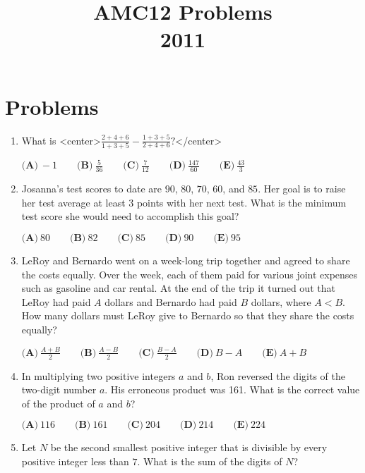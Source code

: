 \documentclass{article}
\title{AMC12 Problems \\ 2011}
\date{}
\begin{document}
\maketitle\thispagestyle{fancy}\newpage\section*{Problems}\begin{enumerate}[label=\arabic*., itemsep=0.5em]\item What is <center>$ \frac{2+4+6}{1+3+5}-\frac{1+3+5}{2+4+6}? $</center>


$\textbf{(A)}\ -1 \qquad \textbf{(B)}\ \frac{5}{36} \qquad \textbf{(C)}\ \frac{7}{12} \qquad \textbf{(D)}\ \frac{147}{60} \qquad \textbf{(E)}\ \frac{43}{3}$\par \vspace{0.5em}\item Josanna's test scores to date are $90$, $80$, $70$, $60$, and $85$.  Her goal is to raise her test average at least $3$ points with her next test.  What is the minimum test score she would need to accomplish this goal?

$\textbf{(A)}\ 80 \qquad \textbf{(B)}\ 82 \qquad \textbf{(C)}\ 85 \qquad \textbf{(D)}\ 90 \qquad \textbf{(E)}\ 95$\par \vspace{0.5em}\item LeRoy and Bernardo went on a week-long trip together and agreed to share the costs equally.  Over the week, each of them paid for various joint expenses such as gasoline and car rental.  At the end of the trip it turned out that LeRoy had paid $A$ dollars and Bernardo had paid $B$ dollars, where $A<B$.  How many dollars must LeRoy give to Bernardo so that they share the costs equally?

$\textbf{(A)}\ \frac{A+B}{2} \qquad \textbf{(B)}\ \frac{A-B}{2} \qquad \textbf{(C)}\ \frac{B-A}{2} \qquad \textbf{(D)}\ B-A \qquad \textbf{(E)}\ A+B$\par \vspace{0.5em}\item In multiplying two positive integers $a$ and $b$, Ron reversed the digits of the two-digit number $a$.  His erroneous product was 161.  What is the correct value of the product of $a$ and $b$?

$\textbf{(A)}\ 116 \qquad \textbf{(B)}\ 161 \qquad \textbf{(C)}\ 204 \qquad \textbf{(D)}\ 214 \qquad \textbf{(E)}\ 224$\par \vspace{0.5em}\item Let $N$ be the second smallest positive integer that is divisible by every positive integer less than $7$.  What is the sum of the digits of $N$?


\end{enumerate}
\end{document}
